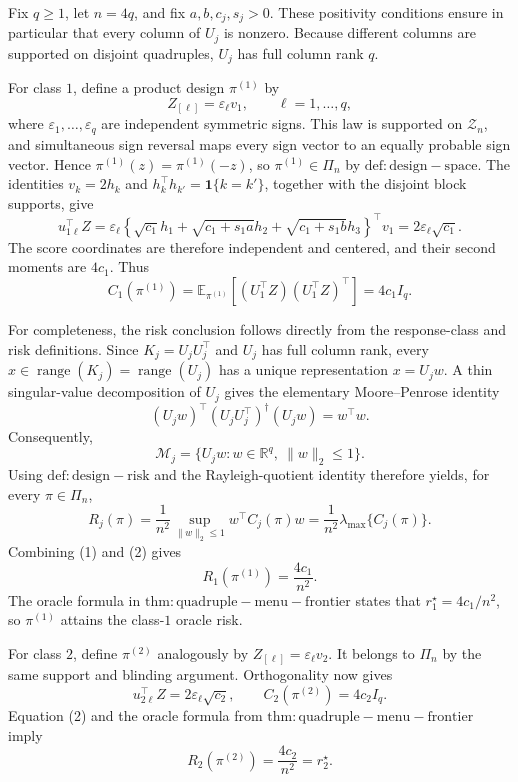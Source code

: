 Fix \(q\geq 1\), let \(n=4q\), and fix \(a,b,c_j,s_j>0\).  These positivity conditions ensure in particular that every column of \(U_j\) is nonzero.  Because different columns are supported on disjoint quadruples, \(U_j\) has full column rank \(q\).

For class \(1\), define a product design \(\pi^{(1)}\) by
\[
 Z_{[\ell]}=\varepsilon_\ell v_1,\qquad \ell=1,\ldots,q,
\]
where \(\varepsilon_1,\ldots,\varepsilon_q\) are independent symmetric signs.  This law is supported on \(\mathcal Z_n\), and simultaneous sign reversal maps every sign vector to an equally probable sign vector.  Hence \(\pi^{(1)}(z)=\pi^{(1)}(-z)\), so \(\pi^{(1)}\in\Pi_n\) by \(\mathrm{def:design-space}\).  The identities \(v_k=2h_k\) and \(h_k^\top h_{k'}=\mathbf 1\{k=k'\}\), together with the disjoint block supports, give
\[
 u_{1\ell}^{\top}Z
 =\varepsilon_\ell
 \left\{\sqrt{c_1}h_1+\sqrt{c_1+s_1a}h_2+
 \sqrt{c_1+s_1b}h_3\right\}^{\!\top}v_1
 =2\varepsilon_\ell\sqrt{c_1}.
\]
The score coordinates are therefore independent and centered, and their second moments are \(4c_1\).  Thus
\[
 C_1(\pi^{(1)})
 =\mathbb E_{\pi^{(1)}}[(U_1^\top Z)(U_1^\top Z)^\top]
 =4c_1I_q. \tag{1}
\]

For completeness, the risk conclusion follows directly from the response-class and risk definitions.  Since \(K_j=U_jU_j^\top\) and \(U_j\) has full column rank, every \(x\in\operatorname{range}(K_j)=\operatorname{range}(U_j)\) has a unique representation \(x=U_jw\).  A thin singular-value decomposition of \(U_j\) gives the elementary Moore--Penrose identity
\[
 (U_jw)^\top(U_jU_j^\top)^\dagger(U_jw)=w^\top w.
\]
Consequently,
\[
 \mathcal M_j=\{U_jw:w\in\mathbb R^q,\ \lVert w\rVert_2\leq1\}.
\]
Using \(\mathrm{def:design-risk}\) and the Rayleigh-quotient identity therefore yields, for every \(\pi\in\Pi_n\),
\[
 R_j(\pi)
 =\frac1{n^2}\sup_{\lVert w\rVert_2\leq1}
 w^\top C_j(\pi)w
 =\frac1{n^2}\lambda_{\max}\{C_j(\pi)\}. \tag{2}
\]
Combining (1) and (2) gives
\[
 R_1(\pi^{(1)})=\frac{4c_1}{n^2}.
\]
The oracle formula in \(\mathrm{thm:quadruple-menu-frontier}\) states that \(r_1^\star=4c_1/n^2\), so \(\pi^{(1)}\) attains the class-\(1\) oracle risk.

For class \(2\), define \(\pi^{(2)}\) analogously by \(Z_{[\ell]}=\varepsilon_\ell v_2\).  It belongs to \(\Pi_n\) by the same support and blinding argument.  Orthogonality now gives
\[
 u_{2\ell}^{\top}Z=2\varepsilon_\ell\sqrt{c_2},
 \qquad C_2(\pi^{(2)})=4c_2I_q.
\]
Equation (2) and the oracle formula from \(\mathrm{thm:quadruple-menu-frontier}\) imply
\[
 R_2(\pi^{(2)})=\frac{4c_2}{n^2}=r_2^\star.
\]

